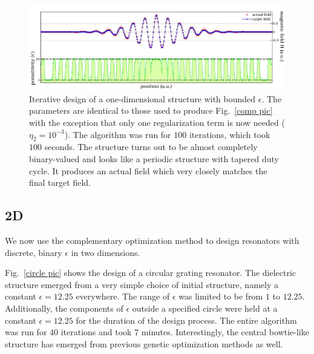 \begin{figure}[htbp]\centering
\includegraphics[width=\textwidth]{p1/bounded}
\caption{Iterative design of a one-dimensional structure with bounded $\epsilon$. 
    The parameters are identical to those used to produce Fig.~\ref{comp pic} with the exception that only one regularization term is now needed ($\eta_2=10^{-3}$). The algorithm was run for $100$ iterations, which took $100$ seconds. The structure turns out to be almost completely binary-valued and looks like a periodic structure with tapered duty cycle. It produces an actual field which very closely matches the final target field.}
\label{bounded comp pic}
\end{figure}

\subsection{2D}

We now use the complementary optimization method to design resonators with discrete, binary $\epsilon$ in two dimensions\cite{Lu10}.

Fig.~\ref{circle pic} shows the design of a circular grating resonator. 
The dielectric structure emerged from a very simple choice of initial structure, 
    namely a constant $\epsilon=12.25$ everywhere. 
The range of $\epsilon$ was limited to be from $1$ to $12.25$.
Additionally, the components of $\epsilon$ outside a specified circle 
    were held at a constant $\epsilon=12.25$ 
    for the duration of the design process. 
The entire algorithm was run for $40$ iterations and took $7$ minutes.
Interestingly, the central bowtie-like structure has emerged 
    from previous genetic optimization methods as well\cite{Gond08}. 


